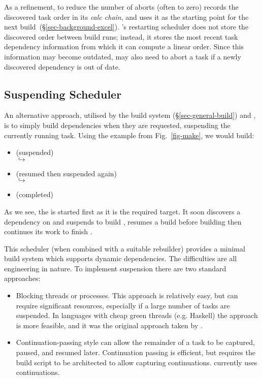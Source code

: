 As a refinement, to reduce the number of aborts (often to zero) \Excel records
the discovered task order in its \emph{calc chain}, and uses it as the starting
point for the next build~(\S\ref{sec-background-excel}). \Bazel's restarting
scheduler does not store the discovered order between build runs; instead, it
stores the most recent task dependency information from which it can compute a
linear order. Since this information may become outdated, \Bazel may also need
to abort a task if a newly discovered dependency is out of date.

\subsection{Suspending Scheduler}\label{sec-suspending}

An alternative approach, utilised by the  build system
(\S\ref{sec-general-build}) and \Shake, is to simply build dependencies when
they are requested, suspending the currently running task. Using the example
from Fig.~\ref{fig-make}, we would build:

\begin{itemize}
\item {} (suspended)\\
  $\hookrightarrow$ 
\item {} (resumed then suspended again)\\
  $\hookrightarrow$   
\item {} (completed)
\end{itemize}

\noindent
As we see, the  is started first as it is the required target. It
soon discovers a dependency on  and suspends to build ,
resumes a build before building  then continues its work to finish
.

This scheduler (when combined with a suitable rebuilder) provides a minimal
build system which supports dynamic dependencies. The difficulties are all
engineering in nature. To implement suspension there are two standard
approaches:

\begin{itemize}
\item Blocking threads or processes. This approach is relatively easy, but can
require significant resources, especially if a large number of tasks are
suspended. In languages with cheap green threads (e.g. Haskell) the approach is
more feasible, and it was the original approach taken by \Shake.
\item Continuation-passing style \cite{claessen_continuations} can allow the
remainder of a task to be captured, paused, and resumed later. Continuation
passing is efficient, but requires the build script to be architected to allow
capturing continuations. \Shake currently uses continuations.
\end{itemize}

